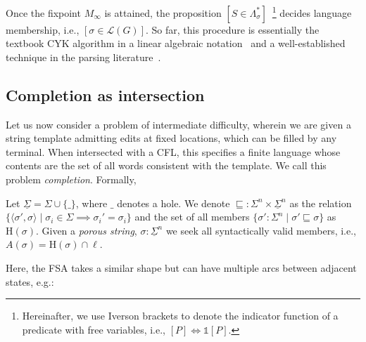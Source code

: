 \documentclass[popl.tex]{subfiles}
\begin{document}
Once the fixpoint $M_\infty$ is attained, the proposition $[S \in \Lambda^*_\sigma]$~\footnote{Hereinafter, we use Iverson brackets to denote the indicator function of a predicate with free variables, i.e., $[P] \Leftrightarrow \mathds{1}[P]$.} decides language membership, i.e., $[\sigma \in \mathcal{L}(G)]$. So far, this procedure is essentially the textbook CYK algorithm in a linear algebraic notation~\cite{goodman1999semiring} and a well-established technique in the parsing literature~\cite{grune2008}.

\subsection{Completion as intersection}

Let us now consider a problem of intermediate difficulty, wherein we are given a string template admitting edits at fixed locations, which can be filled by any terminal. When intersected with a CFL, this specifies a finite language whose contents are the set of all words consistent with the template. We call this problem \textit{completion}. Formally,

\begin{definition}[Completion]
  Let $\underline\Sigma = \Sigma \cup \{\_\}$, where $\_$ denotes a hole. We denote $\sqsubseteq: \Sigma^n \times \underline\Sigma^n$ as the relation $\{\langle\sigma', \sigma\rangle \mid \sigma_i \in \Sigma \implies \sigma_i' = \sigma_i\}$ and the set of all members $\{\sigma': \Sigma^n \mid \sigma' \sqsubseteq \sigma\}$ as $\text{H}(\sigma)$. Given a \textit{porous string}, $\sigma: \underline\Sigma^n$ we seek all syntactically valid members, i.e., $A(\sigma)=\text{H}(\sigma)\cap\ell$.
\end{definition}

Here, the FSA takes a similar shape but can have multiple arcs between adjacent states, e.g.:

\begin{figure}[H]
\end{figure}
\end{document}
